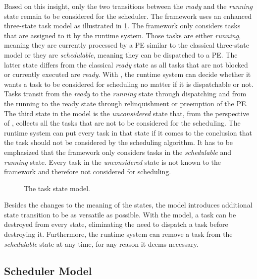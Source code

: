Based on this insight, only the two transitions between the \emph{ready} and the \emph{running} state remain to be considered for the scheduler. The \cobas{} framework uses an enhanced three-state task model as illustrated in \cref{fig:arch:cobas-states}. The framework only considers tasks that are assigned to it by the runtime system. Those tasks are either \emph{running}, meaning they are currently processed by a \ac{PE} similar to the classical three-state model or they are \emph{schedulable}, meaning they can be dispatched to a \ac{PE}. The latter state differs from the classical \emph{ready} state as all tasks that are not blocked or currently executed are \emph{ready}. With \cobas{}, the runtime system can decide whether it wants a task to be considered for scheduling no matter if it is dispatchable or not. Tasks transit from the \emph{ready} to the \emph{running} state through dispatching and from the running to the ready state through relinquishment or preemption of the \ac{PE}. The third state in the \cobas{} model is the \emph{unconsidered} state that, from the perspective of \cobas{}, collects all the tasks that are not to be considered for the scheduling. The runtime system can put every task in that state if it comes to the conclusion that the task should not be considered by the scheduling algorithm. It has to be emphasized that the \cobas{} framework only considers tasks in the \emph{schedulable} and \emph{running} state. Every task in the \emph{unconsidered} state is not known to the framework and therefore not considered for scheduling.

\begin{figure}[t!] \centering
	\caption[The \cobas{} task model.]{The \cobas{} task state model.}%
	\label{fig:arch:cobas-states}
\end{figure}

Besides the changes to the meaning of the states, the \cobas{} model introduces additional state transition to be as versatile as possible. With the \cobas{} model, a task can be destroyed from every state, eliminating the need to dispatch a task before destroying it. Furthermore, the runtime system can remove a task from the \emph{schedulable} state at any time, for any reason it deems necessary.

\subsection{Scheduler Model}%
\label{sec:model:scheduler}


